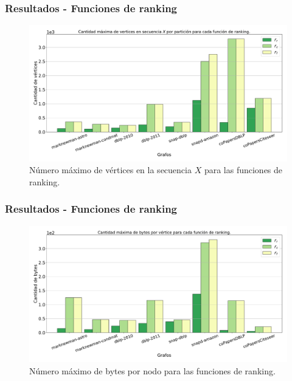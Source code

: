 \begin{frame}
\frametitle{Resultados - Funciones de ranking}

\begin{figure}
    	\centering
    \includegraphics[width=1\linewidth]{../img/maxNodes.pdf}
    	
    \caption{Número máximo de vértices en la secuencia $X$ para las funciones de ranking.}
\end{figure}

\end{frame}

\begin{frame}
\frametitle{Resultados - Funciones de ranking}

\begin{figure}
    	\centering
    \includegraphics[width=1\linewidth]{../img/maxBytes.pdf}
    	
    \caption{Número máximo de bytes por nodo para las funciones de ranking.}
\end{figure}

\end{frame}




